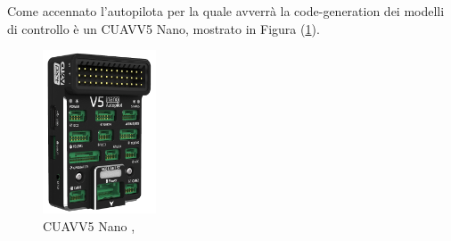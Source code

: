 Come accennato l'autopilota per la quale avverrà la code-generation dei modelli di controllo è un CUAV\textregistered V5 Nano\textregistered, mostrato in Figura (\ref{fig:CUAV}).

\begin{figure}
	\centering
	\includegraphics[width=0.3\textwidth]{DescrizioneAutopilota/Figure/CUAV}
	\caption{CUAV\textregistered V5 Nano , \cite{CUAV}}
	\label{fig:CUAV}
\end{figure}

